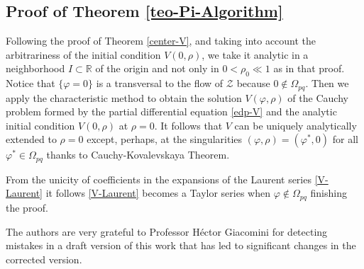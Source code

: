 \documentclass[12pt]{amsart}
\begin{document}
\subsection{Proof of Theorem \ref{teo-Pi-Algorithm}}

Following the proof of Theorem \ref{center-V}, and taking into account the arbitrariness of the initial condition $V(0, \rho)$, we take it analytic in a neighborhood $I \subset \mathbb{R}$ of the origin and not only
in $0 < \rho_0 \ll 1$ as in that proof. Notice that $\{ \varphi = 0 \}$ is a transversal to the flow of $\mathcal{Z}$ because $0 \not\in \Omega_{pq}$. Then we apply the characteristic method to obtain the solution $V(\varphi, \rho)$ of the Cauchy problem formed by the partial differential equation \eqref{edp-V} and the analytic initial condition $V(0, \rho)$ at $\rho=0$. It follows that $V$ can be uniquely analytically extended to $\rho=0$ except, perhaps, at the singularities $(\varphi, \rho) = (\varphi^*, 0)$ for all $\varphi^* \in \Omega_{pq}$ thanks to  Cauchy-Kovalevskaya Theorem.

From the unicity of coefficients in the expansions of the Laurent series \eqref{V-Laurent} it follows \eqref{V-Laurent} becomes a Taylor series when $\varphi \not\in \Omega_{pq}$ finishing the proof.
\newline

 The authors are very grateful to Professor H\'ector Giacomini for detecting mistakes in a draft version of this work that has led to significant changes in the corrected version.

\end{document}
